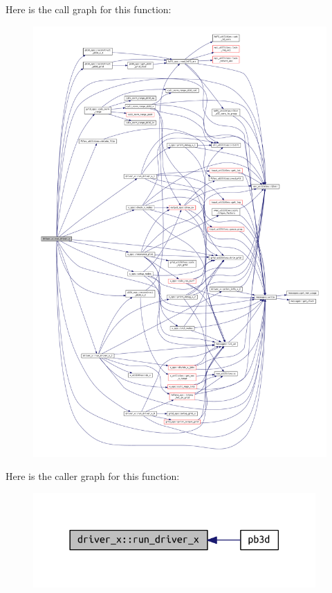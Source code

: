 Here is the call graph for this function\+:\nopagebreak
\begin{figure}[H]
\begin{center}
\leavevmode
\includegraphics[width=350pt]{namespacedriver__x_ada3d72a0929daaa5e3da585246d62281_cgraph}
\end{center}
\end{figure}
Here is the caller graph for this function\+:\nopagebreak
\begin{figure}[H]
\begin{center}
\leavevmode
\includegraphics[width=306pt]{namespacedriver__x_ada3d72a0929daaa5e3da585246d62281_icgraph}
\end{center}
\end{figure}
\mbox{\label{namespacedriver__x_a2b82a9bc6c0f4af9f3468d03fedc008e}} 
